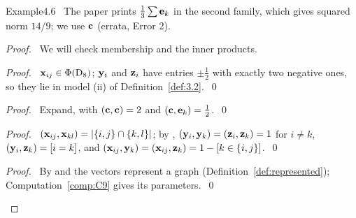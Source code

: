 \begin{cgss}{Example}{4.6}\label{ex:4.6}
 \repair\ The paper prints $\frac13\sum{\mathbf e}_k$ in the second family, which gives squared norm
 $14/9$; we use ${\mathbf c}$ (errata, Error 2).
\end{cgss}
\begin{proof}
 \pfsketch\ We will check membership and the inner products.
 \begin{proof}\pf\ ${\mathbf x}_{ij}\in\Phi(\mathrm{D}_8)$; ${\mathbf y}_i$ and ${\mathbf z}_i$ have entries $\pm\frac12$ with
  exactly two negative ones, so they lie in model (ii) of Definition~\ref{def:3.2}.~\qed\end{proof}
 \begin{proof}\pf\ Expand, with $({\mathbf c},{\mathbf c})=2$ and $({\mathbf c},{\mathbf e}_k)=\frac12$.~\qed\end{proof}
 \begin{proof}\pf\ $({\mathbf x}_{ij},{\mathbf x}_{kl})=|\{i,j\}\cap\{k,l\}|$; by ,
  $({\mathbf y}_i,{\mathbf y}_k)=({\mathbf z}_i,{\mathbf z}_k)=1$ for $i\ne k$, $({\mathbf y}_i,{\mathbf z}_k)=[i=k]$, and
  $({\mathbf x}_{ij},{\mathbf y}_k)=({\mathbf x}_{ij},{\mathbf z}_k)=1-[k\in\{i,j\}]$.~\qed\end{proof}
 \qedstep
 \begin{proof}\pf\ By  and  the vectors represent a graph
  (Definition~\ref{def:represented}); Computation~\ref{comp:C9} gives its
  parameters.~\qed\end{proof}
\end{proof}

